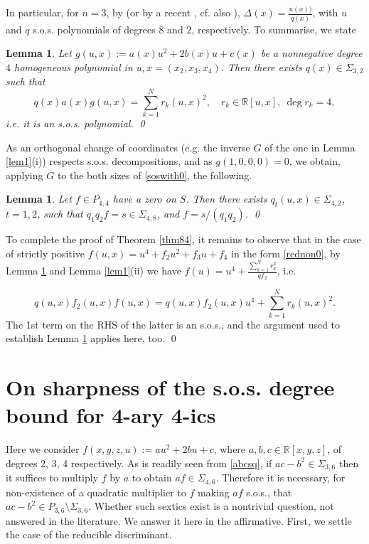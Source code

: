 \documentclass[a4paper,twoside,reqno]{amsart}
\newcommand{\RR}{\mathbb{R}}
\newcommand{\PHF}[2]{P_{{#2},{#1}}}
\newcommand{\SosHF}[2]{\Sigma_{{#2},{#1}}}
\theoremstyle{plain}
\newtheorem{lem}[prop]{Lemma}
\theoremstyle{definition}
\theoremstyle{remark}
\begin{document}
In particular, for $n=3$, by \cite{Hilb-ternsos} (or by a recent \cite[Sect.
5-6]{MR3272733}, cf. also \cite{BSV19}), $\Delta(x)=\frac{u(x))}{q(x)}$,
with $u$ and $q$ s.o.s.  polynomials of degrees $8$ and $2$, respectively. To
summarise, we state

\begin{lem} \label{lem2} 
Let $g(u,x):=a(x)u^2+2b(x)u+c(x)$ be a nonnegative
degree $4$ homogeneous polynomial in $u,x=(x_2,x_3,x_4)$.
Then there exists $q(x)\in\SosHF{2}{3}$ such that
\begin{equation}
q(x)a(x)g(u,x)=\sum_{k=1}^N r_k(u,x)^2,\quad r_k\in \RR[u,x],\ \deg{r_k}=4, \label{soswith0}     
\end{equation}
i.e.  it is  an s.o.s. polynomial. \hfill\qed
\end{lem}

As an orthogonal change of coordinates (e.g. the inverse $G$ of
the one in Lemma \ref{lem1}(i)) respects s.o.s. 
decompositions, and as $g(1,0,0,0)=0$, we obtain, 
applying $G$ to the both sizes of \eqref{soswith0}, the following.

\begin{lem}\label{lem3}
Let $f\in\PHF{4}{4}$ have a zero on $S$. 
Then there exists 
$q_t(u,x)\in\SosHF{2}{4}$, $t=1,2$, such that
$q_1 q_2 f=s\in\SosHF{8}{4}$, and
$f=s/(q_1 q_2)$.  \hfill\qed
\end{lem}

To complete the proof of Theorem \ref{thm84}, 
it remains to observe that in the case of 
strictly positive $f(u,x)=u^4+f_2 u^2+f_3 u+f_4$ in
the form
\eqref{rednon0}, by Lemma \ref{lem2} and Lemma \ref{lem1}(ii) we have 
$f(u)=u^4+\frac{\sum_{k=1}^N r_k^2}{q f_2}$, i.e.

\[ q(u,x)f_2(u,x)f(u,x)=q(u,x)f_2(u,x)u^4+\sum_{k=1}^N r_k(u,x)^2.\]
The 1st term on the RHS of the latter is an s.o.s., and the argument
used to establish Lemma \ref{lem3}  applies here, too. \hfill\qed




\section{On sharpness of the s.o.s. degree bound for 4-ary 4-ics}\label{sect:tern}
Here we consider $f(x,y,z,u):=au^2+2bu+c$, where $a,b,c\in\RR[x,y,z]$, of degrees 2, 3,
4 respectively.
As is readily seen from \eqref{abcsq}, if $ac-b^2\in\SosHF{6}{3}$ then
it suffices to multiply $f$ by $a$ to obtain $af\in\SosHF{6}{4}$. Therefore
it is necessary, for non-existence of a quadratic multiplier to $f$
making $af$ s.o.s., that $ac-b^2\in\PHF{6}{3}\setminus\SosHF{6}{3}$.
Whether such sextics exist is a nontrivial question, not answered in the literature.
We answer it here in the affirmative. First, we settle the case of
the reducible discriminant.
\end{document}
